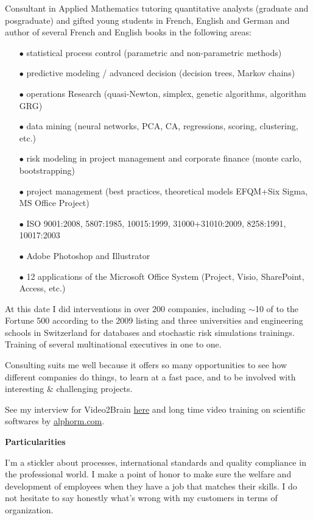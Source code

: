 	Consultant in Applied Mathematics tutoring quantitative analysts (graduate and posgraduate) and gifted young students in French, English and German and author of several French and English books in the following areas:
	\pagebreak
	\begin{itemize}	 
		\item[$\bullet$] statistical process control (parametric and non-parametric methods)
		\item[$\bullet$] predictive modeling / advanced decision (decision trees, Markov chains)
		\item[$\bullet$] operations Research (quasi-Newton, simplex, genetic algorithms, algorithm GRG)
		\item[$\bullet$] data mining (neural networks, PCA, CA, regressions, scoring, clustering, etc.)
		\item[$\bullet$] risk modeling in project management and corporate finance (monte carlo, bootstrapping)
		\item[$\bullet$] project management (best practices, theoretical models EFQM+Six Sigma, MS Office Project)
		\item[$\bullet$] ISO 9001:2008, 5807:1985, 10015:1999, 31000+31010:2009, 8258:1991, 10017:2003
		\item[$\bullet$] Adobe Photoshop and Illustrator
		\item[$\bullet$] 12 applications of the Microsoft Office System (Project, Visio, SharePoint, Access, etc.)
	\end{itemize}
	At this date I did interventions in over 200 companies, including $\sim$10 of to the Fortune 500 according to the 2009 listing and three universities and engineering schools in Switzerland for databases and stochastic risk simulations trainings. Training of several multinational executives in one to one.

	Consulting suits me well because it offers so many opportunities to see how different companies do things, to learn at a fast pace, and to be involved with interesting \& challenging projects.

	See my interview for Video2Brain \href{http://www.youtube.com/watch?v=nOYwENyVPJQ}{{\color{blue}here}} and long time video training on scientific softwares by \href{http://www.alphorm.com}{{\color{blue}alphorm.com}}.

\textbf{Particularities}	

	I'm a stickler about processes, international standards and quality compliance in the professional world. I make a point of honor to make sure the welfare and development of employees when they have a job that matches their skills. I do not hesitate to say honestly what's wrong with my customers in terms of organization.
	

